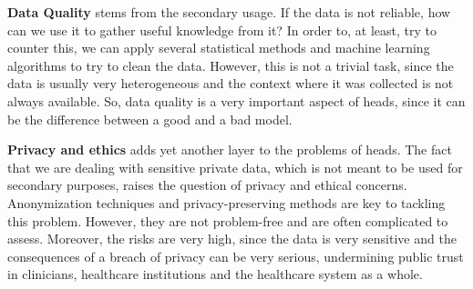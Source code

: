 \textbf{Data Quality} stems from the secondary usage. If the data is not reliable, how can we use it to gather useful knowledge from it? In order to, at least, try to counter this, we can apply several statistical methods and machine learning algorithms to try to clean the data. However, this is not a trivial task, since the data is usually very heterogeneous and the context where it was collected is not always available. So, data quality is a very important aspect of \ac{heads}, since it can be the difference between a good and a bad model.



\textbf{Privacy and ethics} adds yet another layer to the problems of \ac{heads}. The fact that we are dealing with sensitive private data, which is not meant to be used for secondary purposes, raises the question of privacy and ethical concerns. Anonymization techniques and privacy-preserving methods are key to tackling this problem. However, they are not problem-free and are often complicated to assess. Moreover, the risks are very high, since the data is very sensitive and the consequences of a breach of privacy can be very serious, undermining public trust in clinicians, healthcare institutions and the healthcare system as a whole.


